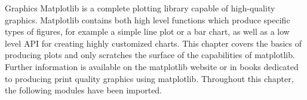 Graphics
Matplotlib is a complete plotting library capable of high-quality graphics. Matplotlib contains both high
level functions which produce specific types of figures, for example a simple line plot or a bar chart, as
well as a low level API for creating highly customized charts. This chapter covers the basics of producing
plots and only scratches the surface of the capabilities of matplotlib. Further information is available on
the matplotlib website or in books dedicated to producing print quality graphics using matplotlib.
Throughout this chapter, the following modules have been imported.
